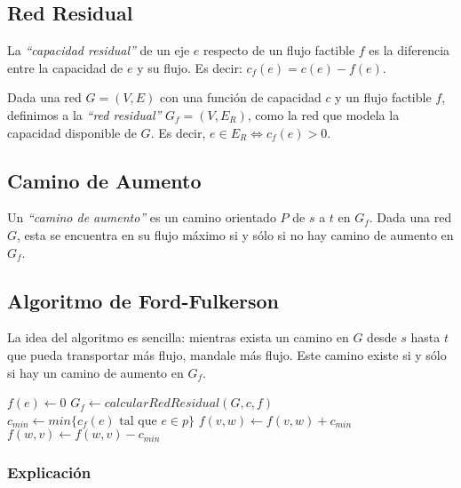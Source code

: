 
\subsection{Red Residual}

La \emph{``capacidad residual''} de un eje $e$ respecto de un flujo factible $f$ es la diferencia entre la capacidad de $e$ y su flujo. Es decir: $c_f(e) = c(e) - f(e)$.

Dada una red $G = (V, E)$ con una funci\'on de capacidad $c$ y un flujo factible $f$, definimos a la \emph{``red residual''} $G_f = (V, E_{R})$, como la red que modela la capacidad disponible de $G$. Es decir, $e \in E_{R} \Longleftrightarrow c_f(e) > 0$. 

\subsection{Camino de Aumento}

Un \emph{``camino de aumento''} es un camino orientado $P$ de $s$ a $t$ en $G_f$. Dada una red $G$, esta se encuentra en su flujo m\'aximo si y s\'olo si no hay camino de aumento en $G_f$.

\subsection{Algoritmo de Ford-Fulkerson}

La idea del algoritmo es sencilla: mientras exista un camino en $G$ desde $s$ hasta $t$ que pueda transportar m\'as flujo, mandale m\'as flujo. Este camino existe si y s\'olo si hay un camino de aumento en $G_f$.

\begin{algorithm}
\begin{algorithmic}[1]
    \State $f(e) \gets 0$
  \EndFor
  \State $G_f \gets calcularRedResidual(G, c, f)$
    \State $c_{min} \gets min\{c_f(e) \textrm{ tal que } e \in p\}$
        \State $f(v,w) \gets f(v,w) + c_{min}$
        \State $f(w,v) \gets f(w,v) - c_{min}$ 
    \EndFor
  \EndWhile
\EndFunction
\end{algorithmic}
\end{algorithm}

\subsubsection*{Explicaci\'on}

